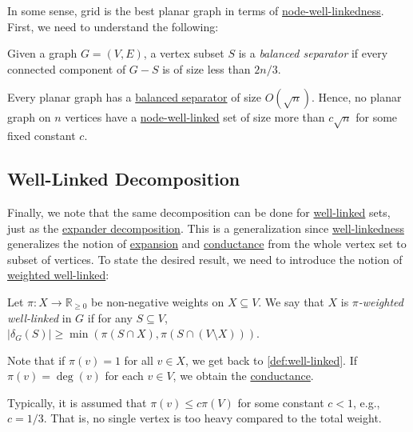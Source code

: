 In some sense, grid is the best planar graph in terms of \hyperref[def:node-well-linked]{node-well-linkedness}. First, we need to understand the following:

\begin{definition}\label{def:balanced-separator}
	Given a graph \(G = (V, E)\), a vertex subset \(S\) is a \emph{balanced separator} if every connected component of \(G-S\) is of size less than \(2n / 3\).
\end{definition}

\begin{theorem}
	Every planar graph has a \hyperref[def:balanced-separator]{balanced separator} of size \(O(\sqrt{n} )\). Hence, no planar graph on \(n\) vertices have a \hyperref[def:node-well-linked]{node-well-linked} set of size more than \(c \sqrt{n} \) for some fixed constant \(c\).
\end{theorem}

\subsection{Well-Linked Decomposition}
Finally, we note that the same decomposition can be done for \hyperref[def:well-linked]{well-linked} sets, just as the \hyperref[def:expander-decomposition]{expander decomposition}. This is a generalization since \hyperref[def:well-linked]{well-linkedness} generalizes the notion of \hyperref[def:expansion]{expansion} and \hyperref[def:conductance]{conductance} from the whole vertex set to subset of vertices. To state the desired result, we need to introduce the notion of \hyperref[def:weighted-well-linked]{weighted well-linked}:

\begin{definition}\label{def:weighted-well-linked}
	Let \(\pi \colon X \to \mathbb{R} _{\geq 0}\) be non-negative weights on \(X \subseteq V\). We say that \(X\) is \emph{\(\pi \)-weighted well-linked} in \(G\) if for any \(S \subseteq V\), \(\lvert \delta _G(S) \rvert \geq \min (\pi (S \cap X), \pi (S \cap (V\setminus X)))\).
\end{definition}

Note that if \(\pi (v) = 1\) for all \(v \in X\), we get back to \autoref{def:well-linked}. If \(\pi (v) = \deg(v)\) for each \(v \in V\), we obtain the \hyperref[def:conductance]{conductance}.

\begin{remark}
	Typically, it is assumed that \(\pi (v) \leq c \pi (V)\) for some constant \(c < 1\), e.g., \(c = 1 / 3\). That is, no single vertex is too heavy compared to the total weight.
\end{remark}

